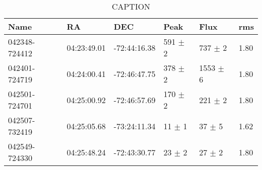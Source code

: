 \begin{table}[ht]
\centering
\begin{tabular}{llllll}
  \hline
Name & RA & DEC & Peak & Flux & rms \\ 
  \hline
042348-724412 & 04:23:49.01 & -72:44:16.38 & 591 $\pm$ 2 & 737 $\pm$ 2 & 1.80 \\ 
  042401-724719 & 04:24:00.41 & -72:46:47.75 & 378 $\pm$ 2 & 1553 $\pm$ 6 & 1.80 \\ 
  042501-724701 & 04:25:00.92 & -72:46:57.69 & 170 $\pm$ 2 & 221 $\pm$ 2 & 1.80 \\ 
  042507-732419 & 04:25:05.68 & -73:24:11.34 & 11 $\pm$ 1 & 37 $\pm$ 5 & 1.62 \\ 
  042549-724330 & 04:25:48.24 & -72:43:30.77 & 23 $\pm$ 2 & 27 $\pm$ 2 & 1.80 \\ 
   \hline
\end{tabular}
\caption{CAPTION} 
\label{fig:askaptable}
\end{table}
